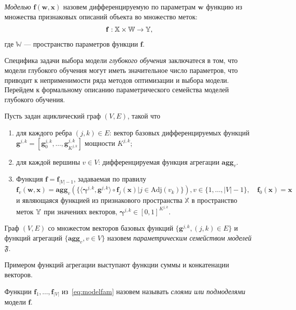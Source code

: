\begin{defin}
\textit{Моделью} $\mathbf{f}(\mathbf{w}, \mathbf{x})$ назовем дифференцируемую по параметрам $\mathbf{w}$ функцию из множества признаковых описаний объекта во множество меток:
\[
    \mathbf{f}: \mathbb{X} \times \mathbb{W} \to \mathbb{Y},
\] 
где $\mathbb{W}$ --- пространство параметров функции $\mathbf{f}$.
\end{defin}
Специфика задачи  выбора модели \textit{глубокого обучения} заключатеся в том, что модели глубокого обучения могут иметь значительное число параметров, что приводит к неприменимости ряда методов оптимизации и выбора модели. 
Перейдем к формальному описанию параметрического семейства моделей глубокого обучения. 
\begin{defin}
Пусть задан ациклический граф $(V,E)$, такой что 
\begin{enumerate}
\item для каждого ребра $(j,k) \in E$: вектор базовых дифференцируемых функций  $\mathbf{g}^{j,k} = [\mathbf{g}^{j,k}_0, \dots, \mathbf{g}^{j,k}_{K^{j,k}}]$  мощности $K^{j,k}$;
\item для каждой вершины $v \in V$: дифференцируемая функция агрегации $\textbf{agg}_v$.
\item Функция $\mathbf{f} = \mathbf{f}_{|V|-1}$, задаваемая по правилу 
\begin{equation}
\label{eq:modelfam}
    \mathbf{f}_{v}(\mathbf{w}, \mathbf{x}) = \textbf{agg}_{v}\left(\{ \langle \boldsymbol{\gamma}^{j,k}, \mathbf{g}^{j,k} \rangle \circ  \mathbf{f}_j(\mathbf{x})| j \in \text{Adj}(v_k)\}\right), v \in \{1,\dots,|V|-1\}, \quad \mathbf{f}_0(\mathbf{x}) = \mathbf{x}
\end{equation}
и являющаяся функцией из признакового пространства $\mathbb{X}$ в пространство меток $\mathbb{Y}$ при значениях векторов, $\boldsymbol{\gamma}^{j,k} \in [0,1]^{K^{j,k}}$.
\end{enumerate}

Граф $(V, E)$ со множестом векторов базовых функций $\{\mathbf{g}^{j,k}, (j,k) \in E\}$ и функций агрегаций $\{ \textbf{agg}_v, {v \in V}\}$ назовем \textit{параметрическим семейством моделей} $\mathfrak{F}$.
\end{defin}

Примером функций агрегации выступают функции суммы и конкатенации векторов.

\begin{defin}
Функции $\mathbf{f}_1, \dots, \mathbf{f}_{|V|}$ из~\eqref{eq:modelfam} назовем называть \textit{слоями или подмоделями} модели $\mathbf{f}$.
\end{defin}

